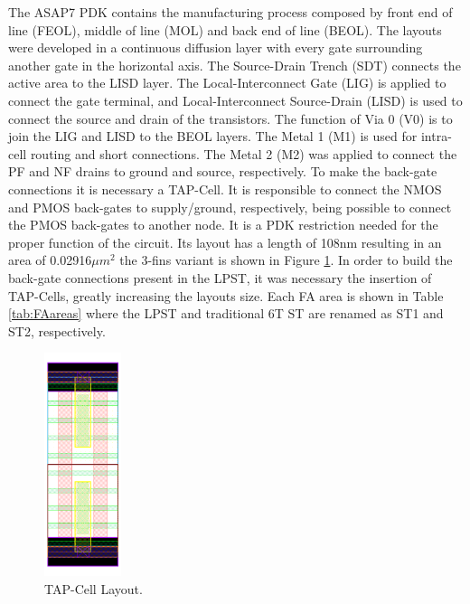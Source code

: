 \documentclass[pgmicro,mestrado,english]{iiufrgs}
\begin{document}



The ASAP7 PDK contains the manufacturing process composed by front end of line (FEOL), middle of line (MOL) and back end of line (BEOL). The layouts were developed in a continuous diffusion layer with every gate surrounding another gate in the horizontal axis. The Source-Drain Trench (SDT) connects the active area to the LISD layer. The Local-Interconnect Gate (LIG) is applied to connect the gate terminal, and Local-Interconnect Source-Drain (LISD) is used to connect the source and drain of the transistors. The function of Via 0 (V0) is to join the LIG and LISD to the BEOL layers. The Metal 1 (M1) is used for intra-cell routing and short connections. The Metal 2 (M2) was applied to connect the PF and NF drains to ground and source, respectively. To make the back-gate connections it is necessary a TAP-Cell. It is responsible to connect the NMOS and PMOS back-gates to supply/ground, respectively, being possible to connect the PMOS back-gates to another node. It is a PDK restriction needed for the proper function of the circuit. Its layout has a length of 108nm resulting in an area of 0.02916${\mu}m^{2}$ the 3-fins variant is shown in Figure \ref{tap}. In order to build the back-gate connections present in the LPST, it was necessary the insertion of TAP-Cells, greatly increasing the layouts size. Each FA area is shown in Table \ref{tab:FAareas} where the LPST and traditional 6T ST are renamed as ST1 and ST2, respectively.

\begin{figure}[H]
\centering
\includegraphics[width=0.2\textwidth]{TAP.png}
\caption{TAP-Cell Layout.}
\label{tap}
\end{figure}
\end{document}
